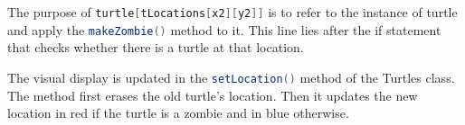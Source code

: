 \documentclass[12pt]{article}
\newcommand{\lstJava}[1]{\lstinline[language=Java,breaklines=true,basicstyle= \listingsfontinline]$#1$}
\newenvironment{question}[2][Question]{\begin{trivlist}
\item[\hskip \labelsep {\bfseries #1}\hskip \labelsep {\bfseries #2.}]}{\end{trivlist}}
\begin{document}
\begin{question}{9}
	The purpose of \lstJava{turtle[tLocations[x2][y2]]} is to refer to the instance of turtle and apply the 
	\lstJava{makeZombie()} method to it. This line lies after the if statement that checks whether there is 
	a turtle at that location.
	
\end{question}
\begin{question}{10}
	The visual display is updated in the \lstJava{setLocation()} method of the Turtles class. The method
	first erases the old turtle's location. Then it updates the new location in red if the turtle is a zombie
	and in blue otherwise.
	
\end{question}
\end{document}
